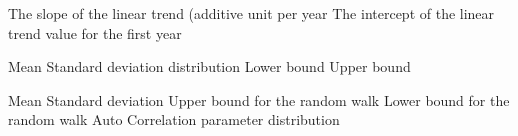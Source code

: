  {The slope of the linear trend (additive unit per year}
 {The intercept of the linear trend value for the first year}
\par\textbf{}\par
{} {Mean}
 {Standard deviation}
 {distribution}
 {Lower bound}
 {Upper bound}
\par\textbf{}\par
{} {Mean}
 {Standard deviation}
 {Upper bound for the random walk}
 {Lower bound for the random walk}
 {Auto Correlation parameter}
 {distribution}
